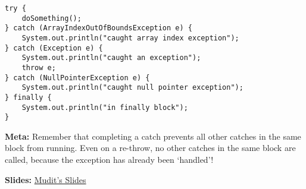 \begin{blocksection}
\question

\begin{lstlisting}
try {
    doSomething();
} catch (ArrayIndexOutOfBoundsException e) {
    System.out.println("caught array index exception");
} catch (Exception e) {
    System.out.println("caught an exception");
    throw e;
} catch (NullPointerException e) {
    System.out.println("caught null pointer exception");
} finally {
    System.out.println("in finally block");
}
\end{lstlisting}


\begin{solution}
\textbf{Meta:} Remember that completing a catch prevents all other catches
in the same block from running. Even on a re-throw, no other catches in the
same block are called, because the exception has already been `handled'!

\textbf{Slides:}
\href{https://docs.google.com/presentation/d/1j418bduZS2Ltm6dVVg-b3WpGbOGrRUm6DKRkZCByuaQ/edit?usp=sharing}
     {Mudit's Slides}
\end{solution}
\end{blocksection}
